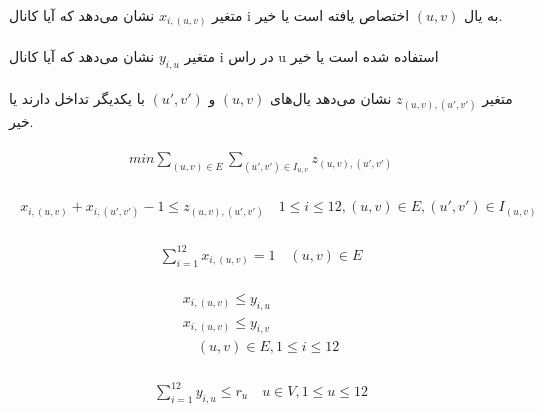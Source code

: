 \documentclass[paper=a4, fontsize=11pt]{article}
\numberwithin{equation}{section} %
\numberwithin{figure}{section} %
\numberwithin{table}{section} %
\begin{document}
\paragraph{}
متغیر $x_{i,(u,v)}$ نشان می‌دهد که آیا کانال i به یال $(u,v)$
اختصاص یافته است یا خیر.

\paragraph{}
متغیر $y_{i,u}$ نشان می‌دهد
که آیا کانال i در راس u استفاده شده است یا خیر

\paragraph{}
متغیر $z_{(u,v),(u',v')}$
نشان می‌دهد یال‌های $(u,v)$ و $(u',v')$ با یکدیگر تداخل دارند یا خیر.

\begin{align}
\begin{split}
	min \sum_{(u,v) \in E}\sum_{(u',v') \in I_{u,v}} z_{(u,v),(u',v')}
\end{split}
\end{align}

\begin{align}
\begin{split}
	x_{i,(u,v)} + x_{i,(u',v')} - 1 \le z_{(u,v),(u',v')}
	\quad
	1 \le i \le 12, (u,v) \in E, (u',v') \in I_{(u,v)}
\end{split}
\end{align}

\begin{align}
\begin{split}
	\sum_{i=1}^{12} x_{i,(u,v)} = 1
	\quad (u,v) \in E
\end{split}
\end{align}

\begin{align}
\begin{split}
	x_{i,(u,v)} \le y_{i,u}\\
	x_{i,(u,v)} \le y_{i,v}\\
	\quad (u,v) \in E, 1 \le i \le 12
\end{split}
\end{align}

\begin{align}
\begin{split}
	\sum_{i=1}^{12} y_{i,u} \le r_u
	\quad u \in V, 1 \le u \le 12
\end{split}
\end{align}
\end{document}

